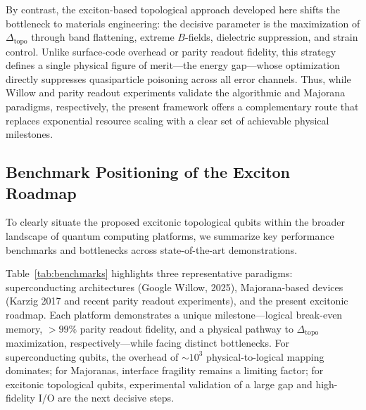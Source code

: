 \documentclass[aps,prl,twocolumn,superscriptaddress]{revtex4-2}
\begin{document}
By contrast, the exciton-based topological approach developed here shifts the bottleneck to materials engineering: the decisive parameter is the maximization of $\Delta_{\text{topo}}$ through band flattening, extreme $B$-fields, dielectric suppression, and strain control. 
Unlike surface-code overhead or parity readout fidelity, this strategy defines a single physical figure of merit---the energy gap---whose optimization directly suppresses quasiparticle poisoning across all error channels. 
Thus, while Willow and parity readout experiments validate the algorithmic and Majorana paradigms, respectively, the present framework offers a complementary route that replaces exponential resource scaling with a clear set of achievable physical milestones.
\subsection{Benchmark Positioning of the Exciton Roadmap}
To clearly situate the proposed excitonic topological qubits within the broader landscape of quantum computing platforms, we summarize key performance benchmarks and bottlenecks across state-of-the-art demonstrations. 

Table~\ref{tab:benchmarks} highlights three representative paradigms: superconducting architectures (Google Willow, 2025), Majorana-based devices (Karzig 2017 and recent parity readout experiments), and the present excitonic roadmap. Each platform demonstrates a unique milestone---logical break-even memory, $>99\%$ parity readout fidelity, and a physical pathway to $\Delta_{\text{topo}}$ maximization, respectively---while facing distinct bottlenecks. For superconducting qubits, the overhead of $\sim 10^3$ physical-to-logical mapping dominates; for Majoranas, interface fragility remains a limiting factor; for excitonic topological qubits, experimental validation of a large gap and high-fidelity I/O are the next decisive steps. 
\end{document}
